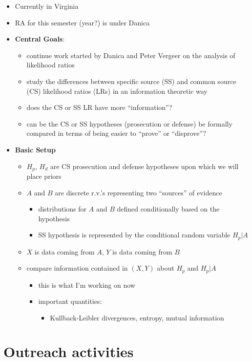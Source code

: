 \documentclass[]{book}
\providecommand{\tightlist}{%
  \setlength{\itemsep}{0pt}\setlength{\parskip}{0pt}}
\begin{document}
\begin{itemize}
\tightlist
\item
  Currently in Virginia
\item
  RA for this semester (year?) is under Danica
\item
  \textbf{Central Goals}:

  \begin{itemize}
  \tightlist
  \item
    continue work started by Danica and Peter Vergeer on the analysis of likelihood ratios
  \item
    study the differences between specific source (SS) and common source (CS) likelihood ratios (LRs) in an information theoretic way
  \item
    does the CS or SS LR have more ``information''?
  \item
    can be the CS or SS hypotheses (prosecution or defense) be formally compared in terms of being easier to ``prove'' or ``disprove''?
  \end{itemize}
\item
  \textbf{Basic Setup}

  \begin{itemize}
  \tightlist
  \item
    \(H_p\), \(H_d\) are CS prosecution and defense hypotheses upon which we will place priors\\
  \item
    \(A\) and \(B\) are discrete r.v.'s representing two ``sources'' of evidence

    \begin{itemize}
    \tightlist
    \item
      distributions for \(A\) and \(B\) defined conditionally based on the hypothesis
    \item
      SS hypothesis is represented by the conditional random variable \(H_p|A\)
    \end{itemize}
  \item
    \(X\) is data coming from \(A\), \(Y\) is data coming from \(B\)
  \item
    compare information contained in \((X,Y)\) about \(H_p\) and \(H_p|A\)

    \begin{itemize}
    \tightlist
    \item
      this is what I'm working on now
    \item
      important quantities:

      \begin{itemize}
      \tightlist
      \item
        Kullback-Leibler divergences, entropy, mutual information
      \end{itemize}
    \end{itemize}
  \end{itemize}
\end{itemize}

\hypertarget{outreach-activities}{%
\chapter{Outreach activities}\label{outreach-activities}}


\end{document}

